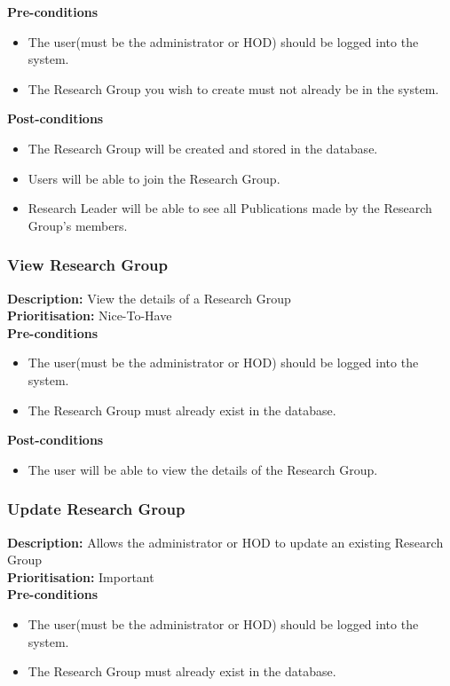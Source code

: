 \documentclass[a4paper]{article}
\begin{document}
	\textbf{Pre-conditions}
	 \begin{itemize}
		\item The user(must be the administrator or HOD) should be logged into the system.
		\item The Research Group you wish to create must not already be in the system.
	\end{itemize}
	
	\textbf{Post-conditions}
	 \begin{itemize}
		\item The Research Group will be created and stored in the database.
		\item Users will be able to join the Research Group.
		\item Research Leader will be able to see all Publications made by the Research Group's members.
	\end{itemize}
	\pagebreak
	\subsubsection{View Research Group}
	\textbf{Description:} View the details of a Research Group \\
	\textbf{Prioritisation:} Nice-To-Have\\
	
	\textbf{Pre-conditions}
	 \begin{itemize}
		\item The user(must be the administrator or HOD) should be logged into the system.
		\item The Research Group must already exist in the database.
    \end{itemize}
	
	\textbf{Post-conditions}
	 \begin{itemize}
		\item The user will be able to view the details of the Research Group.
	\end{itemize}
	\pagebreak
	\subsubsection{Update Research Group}
	\textbf{Description:} Allows the administrator or HOD to update an existing Research Group\\
	\textbf{Prioritisation:} Important\\
	
	\textbf{Pre-conditions}
	 \begin{itemize}
		\item The user(must be the administrator or HOD) should be logged into the system.
		\item The Research Group must already exist in the database.
	\end{itemize}
	
\end{document}
